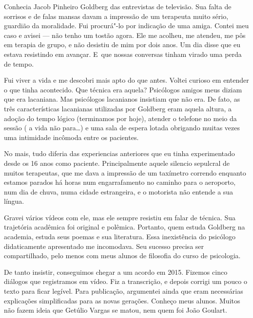  

Conhecia Jacob Pinheiro Goldberg das entrevistas de televisão. Sua falta
de sorrisos e de falas mansas davam a impressão de um terapeuta muito
sério, guardião da moralidade. Fui procurá"-lo por indicação de uma
amiga. Contei meu caso e avisei --- não tenho um tostão agora. Ele me
acolheu, me atendeu, me pôs em terapia de grupo, e não desistiu de mim
por dois anos. Um dia disse que eu estava resistindo em avançar. E~que
nossas conversas tinham virado uma perda de tempo.

Fui viver a vida e me descobri mais apto do que antes. Voltei curioso em
entender o que tinha acontecido. Que técnica era aquela? Psicólogos
amigos meus diziam que era lacaniana. Mas psicólogos lacanianos
insistiam que não era. De fato, as três características lacanianas
utilizadas por Goldberg eram aquela altura, a adoção do tempo lógico
(terminamos por hoje), atender o telefone no meio da sessão ( a vida não
para…) e uma sala de espera lotada obrigando muitas vezes uma
intimidade incômoda entre os pacientes.

No mais, tudo diferia das experiencias anteriores que eu tinha
experimentado desde os 16 anos como paciente. Principalmente aquele
silencio sepulcral de muitos terapeutas, que me dava a impressão de um
taxímetro correndo enquanto estamos parados há horas num engarrafamento
no caminho para o aeroporto, num dia de chuva, numa cidade estrangeira,
e o motorista não entende a sua língua.

Gravei vários vídeos com ele, mas ele sempre resistiu em falar de
técnica. Sua trajetória acadêmica foi original e polêmica. Portanto,
quem estuda Goldberg na academia, estuda seus poemas e sua literatura.
Essa inexistência do psicólogo didaticamente apresentado me incomodava.
Seu sucesso precisa ser compartilhado, pelo menos com meus alunos de
filosofia do curso de psicologia.

De tanto insistir, conseguimos chegar a um acordo em 2015. Fizemos cinco
diálogos que registramos em vídeo. Fiz a transcrição, e depois corrigi
um pouco o texto para ficar legível. Para publicação, argumentei ainda
que eram necessárias explicações simplificadas para as novas gerações.
Conheço meus alunos. Muitos não fazem ideia que Getúlio Vargas se matou,
nem quem foi João Goulart.


